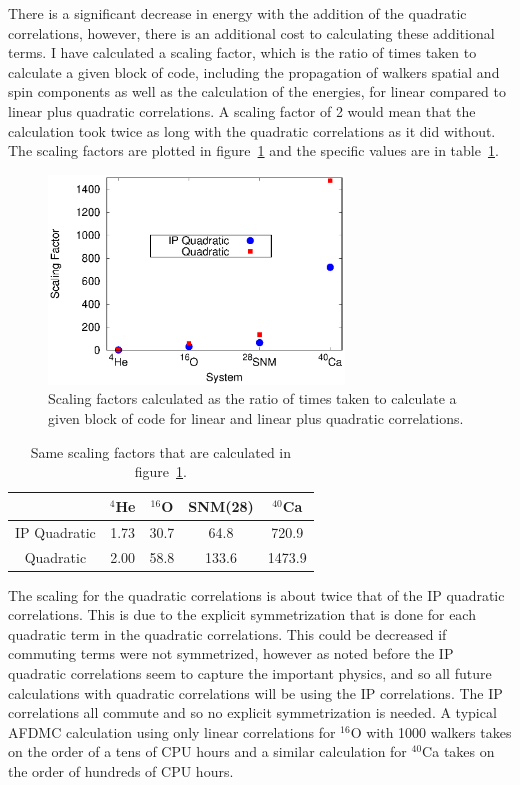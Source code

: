 There is a significant decrease in energy with the addition of the quadratic correlations, however, there is an additional cost to calculating these additional terms. I have calculated a scaling factor, which is the ratio of times taken to calculate a given block of code, including the propagation of walkers spatial and spin components as well as the calculation of the energies, for linear compared to linear plus quadratic correlations. A scaling factor of 2 would mean that the calculation took twice as long with the quadratic correlations as it did without. The scaling factors are plotted in figure~\ref{fig:scaling} and the specific values are in table~\ref{tab:scaling}.
\begin{figure}[h!]
   \centering
   \includegraphics[width=0.7\textwidth]{figures/scaling.eps}
   \caption{Scaling factors calculated as the ratio of times taken to calculate a given block of code for linear and linear plus quadratic correlations.}
   \label{fig:scaling}
\end{figure}
\begin{table}[htb]
   \centering
   \begin{tabular}{ccccc}
      \hline \hline
       & $^{4}$He & $^{16}$O & SNM(28) & $^{40}$Ca \\
      \hline
      IP Quadratic & 1.73 & 30.7 & 64.8 & 720.9 \\
      Quadratic & 2.00 & 58.8 & 133.6 & 1473.9 \\
      \hline \hline
   \end{tabular}
   \label{tab:scaling}
   \caption{Same scaling factors that are calculated in figure~\ref{fig:scaling}.}
\end{table}
The scaling for the quadratic correlations is about twice that of the IP quadratic correlations. This is due to the explicit symmetrization that is done for each quadratic term in the quadratic correlations. This could be decreased if commuting terms were not symmetrized, however as noted before the IP quadratic correlations seem to capture the important physics, and so all future calculations with quadratic correlations will be using the IP correlations. The IP correlations all commute and so no explicit symmetrization is needed. A typical AFDMC calculation using only linear correlations for $^{16}$O with 1000 walkers takes on the order of a tens of CPU hours and a similar calculation for $^{40}$Ca takes on the order of hundreds of CPU hours.

